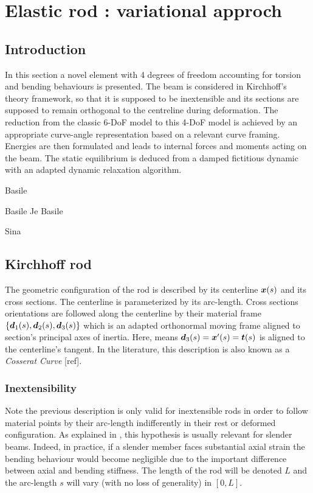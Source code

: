 \chapter{Elastic rod : variational approch}

\section{Introduction}

In this section a novel element with 4 degrees of freedom accounting for torsion and bending behaviours is presented. The beam is considered in Kirchhoff’s theory framework, so that it is supposed to be inextensible and its sections are supposed to remain orthogonal to the centreline during deformation. The reduction from the classic 6-DoF model to this 4-DoF model is achieved by an appropriate curve-angle representation based on a relevant curve framing. Energies are then formulated and leads to internal forces and moments acting on the beam. The static equilibrium is deduced from a damped fictitious dynamic with an adapted dynamic relaxation algorithm.

Basile \cite{Bergou2010}

Basile \cite{Bergou2008}
Je
Basile \cite{Audoly2000}

Sina \cite{Nabei2014}


\section{Kirchhoff rod}
The geometric configuration of the rod is described by its centerline $\boldsymbol{x}(s)$ and its cross sections. The centerline is parameterized by its arc-length. Cross sections orientations are followed along the centerline by their material frame $\{\boldsymbol{d}_1 (s),\boldsymbol{d}_2 (s),\boldsymbol{d}_3 (s)\}$ which is an adapted orthonormal moving frame aligned to section’s principal axes of inertia. Here,  means $\boldsymbol{d}_3 (s)=\boldsymbol{x}'(s)=\boldsymbol{t}(s)$ is aligned to the centerline’s tangent. In the literature, this description is also known as a \emph{Cosserat Curve} [ref].

\subsection{Inextensibility}
Note the previous description is only valid for inextensible rods in order to follow material points by their arc-length indifferently in their rest or deformed configuration. As explained in \cite{Audoly2010}, this hypothesis is usually relevant for slender beams. Indeed, in practice, if a slender member faces substantial axial strain the bending behaviour would become negligible due to the important difference between axial and bending stiffness. The length of the rod will be denoted $L$ and the arc-length $s$ will vary (with no loss of generality) in $[0,L]$.


